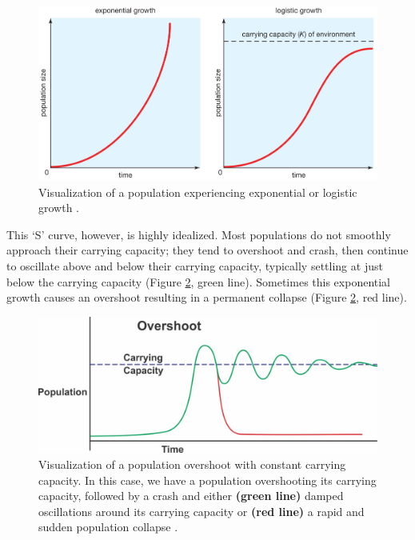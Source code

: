 \documentclass{article}
\begin{document}
\begin{figure}[h]
    \includegraphics[width=.8 \textwidth]{./images_moores/population_logistic_curve.jpeg}
    \centering
    \caption{Visualization of a population experiencing exponential or logistic growth \cite{britanica2012populationgrowth}.}
    \label{population_logistic_curve}
\end{figure}

This `S' curve, however, is highly idealized. Most populations do not smoothly approach their carrying capacity; they tend to overshoot and crash, then continue to oscillate above and below their carrying capacity, typically settling at just below the carrying capacity (Figure \ref{population_carrying_capacity_oscillate}, green line). Sometimes this exponential growth causes an overshoot resulting in a permanent collapse (Figure \ref{population_carrying_capacity_oscillate}, red line).

\begin{figure}[h]
    \includegraphics[width=.8 \textwidth]{./images_moores/population_carrying_capacity_oscillate.jpeg}
    \centering
    \caption{Visualization of a population overshoot with constant carrying capacity. In this case, we have a population overshooting its carrying capacity, followed by a crash and either \textbf{(green line)} damped oscillations around its carrying capacity or \textbf{(red line)} a rapid and sudden population collapse \cite{mills2018bumpyroaddown}.}
    \label{population_carrying_capacity_oscillate}
\end{figure}
\end{document}
